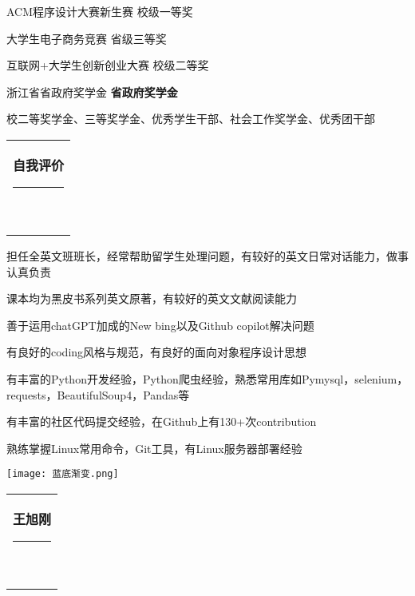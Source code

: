\documentclass[10pt,A4]{article}
\renewcommand{\CJKglue}{\hskip 1.5pt}
\newcommand{\mpwidth}{\linewidth-\fboxsep-\fboxsep} %
\newcommand{\cvtext}[1] {
	\begin{tabular*}{1\mpwidth}{p{0.98\mpwidth}}
		\parbox{1\mpwidth}{#1}
	\end{tabular*}
}
\newcommand{\mysection}[1] {
	
    \vspace{12pt}

	\cvtext{
        \begingroup
        \renewcommand{\CJKglue}{\hskip 2.5pt}
		\textbf{\LARGE{\textcolor{darkcol}{\uppercase{#1}}}}\\[-4pt]
		\textcolor{maincol}{ \rule{0.143\textwidth}{2pt} } \\[-6pt]
        \endgroup
        }
}
\newcommand{\name}[1] {
	
    \vspace{12pt}

	\cvtext{
        \begingroup
        \renewcommand{\CJKglue}{\hskip 2.5pt}
		\textbf{\LARGE{\textcolor{darkcol}{\uppercase{#1}}}}\\[-4pt]
		\textcolor{maincol}{ \rule{0.105\textwidth}{2pt} } \\[-6pt]
        \endgroup
        }
}
\newcommand{\cvlist}[1] {


	\begin{itemize}
        {#1}
    \end{itemize}

    \vspace{3pt}

    }
\begin{document}
\begin{paracol}{2}
\begin{leftcolumn}
{        \item ACM程序设计大赛新生赛  { \hfill 校级一等奖 }

        \item 大学生电子商务竞赛  { \hfill 省级三等奖 }

        \item 互联网+大学生创新创业大赛  { \hfill 校级二等奖 }

        \item 浙江省省政府奖学金  { \hfill \textbf{省政府奖学金} }

        \item 校二等奖学金、三等奖学金、优秀学生干部、社会工作奖学金、优秀团干部

        }
        \vspace{-20pt}

        \vfill\null

        \mysection{自我评价}

        \cvlist{
            \item 担任全英文班班长，经常帮助留学生处理问题，有较好的英文日常对话能力，做事认真负责
            \item 课本均为黑皮书系列英文原著，有较好的英文文献阅读能力
            \item 善于运用chatGPT加成的New bing以及Github copilot解决问题
            \item 有良好的coding风格与规范，有良好的面向对象程序设计思想
            \item 有丰富的Python开发经验，Python爬虫经验，熟悉常用库如Pymysql，selenium，requests，BeautifulSoup4，Pandas等
            \item 有丰富的社区代码提交经验，在Github上有130+次contribution
            \item 熟练掌握Linux常用命令，Git工具，有Linux服务器部署经验
        }

        \vfill\null

    \end{leftcolumn}

    \begin{rightcolumn}

        {\begin{center}\texttt{[image: 蓝底渐变.png]}\end{center}}

        \vfill\null

        \name{王旭刚}


\end{rightcolumn}
\end{paracol}
\end{document}
